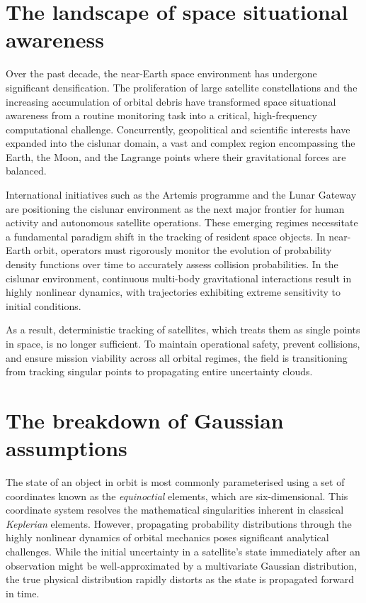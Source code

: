 \section{The landscape of space situational awareness}

Over the past decade, the near-Earth space environment has undergone significant densification. The proliferation of large satellite constellations and the increasing accumulation of orbital debris have transformed space situational awareness from a routine monitoring task into a critical, high-frequency computational challenge. Concurrently, geopolitical and scientific interests have expanded into the cislunar domain, a vast and complex region encompassing the Earth, the Moon, and the Lagrange points where their gravitational forces are balanced.

International initiatives such as the Artemis programme and the Lunar Gateway are positioning the cislunar environment as the next major frontier for human activity and autonomous satellite operations. These emerging regimes necessitate a fundamental paradigm shift in the tracking of resident space objects. In near-Earth orbit, operators must rigorously monitor the evolution of probability density functions over time to accurately assess collision probabilities. In the cislunar environment, continuous multi-body gravitational interactions result in highly nonlinear dynamics, with trajectories exhibiting extreme sensitivity to initial conditions.

As a result, deterministic tracking of satellites, which treats them as single points in space, is no longer sufficient. To maintain operational safety, prevent collisions, and ensure mission viability across all orbital regimes, the field is transitioning from tracking singular points to propagating entire uncertainty clouds.

\section{The breakdown of Gaussian assumptions} \label{sec:gaussian_breakdown}

The state of an object in orbit is most commonly parameterised using a set of coordinates known as the \emph{equinoctial} elements, which are six-dimensional. This coordinate system resolves the mathematical singularities inherent in classical \emph{Keplerian} elements. However, propagating probability distributions through the highly nonlinear dynamics of orbital mechanics poses significant analytical challenges. While the initial uncertainty in a satellite's state immediately after an observation might be well-approximated by a multivariate Gaussian distribution, the true physical distribution rapidly distorts as the state is propagated forward in time. 

